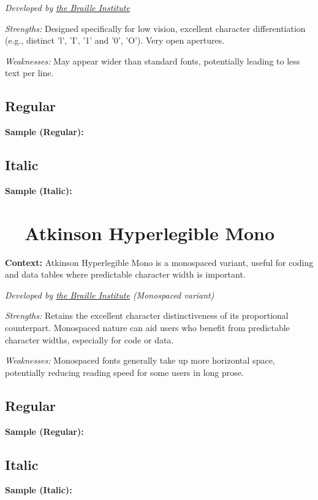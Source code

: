 \emph{Developed by \href{https://brailleinstitute.org/freefont}{the Braille Institute}}
\begin{raggedright}
	\emph{Strengths:} Designed specifically for low vision, excellent character differentiation (e.g., distinct 'l', 'I', '1' and '0', 'O'). Very open apertures.

	\emph{Weaknesses:} May appear wider than standard fonts, potentially leading to less text per line.

	\subsection{Regular}\label{app5:subsec:atkinson-regular}
	\noindent\textbf{Sample (Regular):}
	\FontSample{\atkinsonhyperlegiblefont}

	\subsection{Italic}\label{app5:subsec:atkinson-italic}
	\noindent\textbf{Sample (Italic):}
	\FontSample{{\atkinsonhyperlegiblefont\itshape}}
\end{raggedright}


\pagebreak
\section{~~Atkinson Hyperlegible Mono}\label{app5:sec:atkinson-mono}
\noindent
\textbf{Context:} Atkinson Hyperlegible Mono is a monospaced variant, useful for coding and data tables where predictable character width is important.

\emph{Developed by \href{https://brailleinstitute.org/freefont}{the Braille Institute} (Monospaced variant)}
\begin{raggedright}
	\emph{Strengths:} Retains the excellent character distinctiveness of its proportional counterpart. Monospaced nature can aid users who benefit from predictable character widths, especially for code or data.

	\emph{Weaknesses:} Monospaced fonts generally take up more horizontal space, potentially reducing reading speed for some users in long prose.

	\subsection{Regular}\label{app5:subsec:mono-regular}
	\noindent\textbf{Sample (Regular):}
	\FontSample{\atkinsonmonofont}

	\subsection{Italic}\label{app5:subsec:mono-italic}
	\noindent\textbf{Sample (Italic):}
	\FontSample{{\atkinsonmonofont\itshape}}
\end{raggedright}


